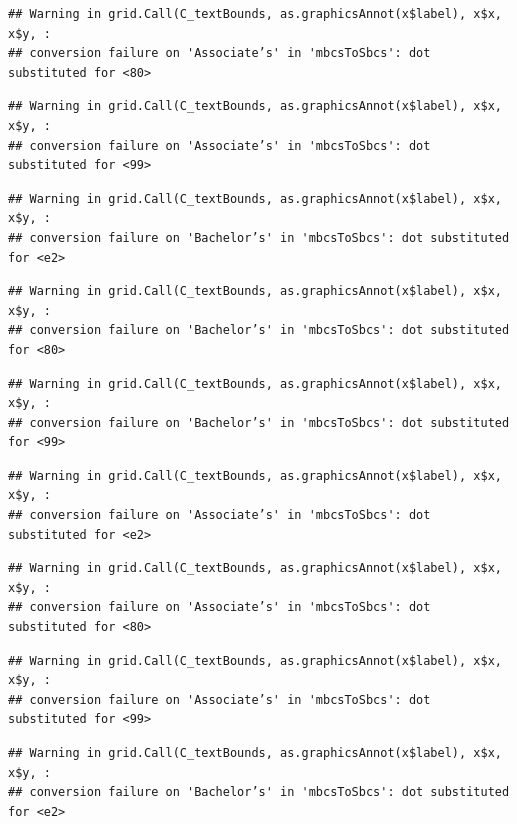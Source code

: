 \documentclass[
]{article}
\begin{document}
\begin{verbatim}
## Warning in grid.Call(C_textBounds, as.graphicsAnnot(x$label), x$x, x$y, :
## conversion failure on 'Associate’s' in 'mbcsToSbcs': dot substituted for <80>
\end{verbatim}

\begin{verbatim}
## Warning in grid.Call(C_textBounds, as.graphicsAnnot(x$label), x$x, x$y, :
## conversion failure on 'Associate’s' in 'mbcsToSbcs': dot substituted for <99>
\end{verbatim}

\begin{verbatim}
## Warning in grid.Call(C_textBounds, as.graphicsAnnot(x$label), x$x, x$y, :
## conversion failure on 'Bachelor’s' in 'mbcsToSbcs': dot substituted for <e2>
\end{verbatim}

\begin{verbatim}
## Warning in grid.Call(C_textBounds, as.graphicsAnnot(x$label), x$x, x$y, :
## conversion failure on 'Bachelor’s' in 'mbcsToSbcs': dot substituted for <80>
\end{verbatim}

\begin{verbatim}
## Warning in grid.Call(C_textBounds, as.graphicsAnnot(x$label), x$x, x$y, :
## conversion failure on 'Bachelor’s' in 'mbcsToSbcs': dot substituted for <99>
\end{verbatim}

\begin{verbatim}
## Warning in grid.Call(C_textBounds, as.graphicsAnnot(x$label), x$x, x$y, :
## conversion failure on 'Associate’s' in 'mbcsToSbcs': dot substituted for <e2>
\end{verbatim}

\begin{verbatim}
## Warning in grid.Call(C_textBounds, as.graphicsAnnot(x$label), x$x, x$y, :
## conversion failure on 'Associate’s' in 'mbcsToSbcs': dot substituted for <80>
\end{verbatim}

\begin{verbatim}
## Warning in grid.Call(C_textBounds, as.graphicsAnnot(x$label), x$x, x$y, :
## conversion failure on 'Associate’s' in 'mbcsToSbcs': dot substituted for <99>
\end{verbatim}

\begin{verbatim}
## Warning in grid.Call(C_textBounds, as.graphicsAnnot(x$label), x$x, x$y, :
## conversion failure on 'Bachelor’s' in 'mbcsToSbcs': dot substituted for <e2>
\end{verbatim}
\end{document}
